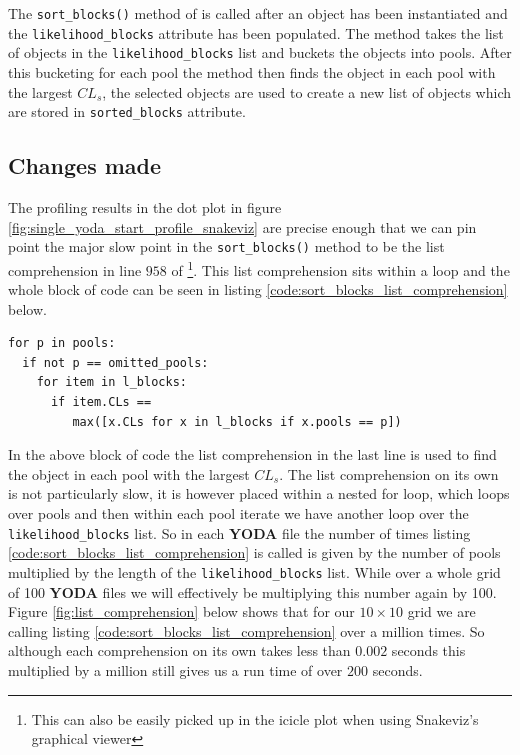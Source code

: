 The \texttt{sort\_blocks()} method of  is called after an object has been instantiated and the \texttt{likelihood\_blocks} attribute has been populated. The method takes the list of  objects in the \texttt{likelihood\_blocks} list and buckets the  objects into pools. After this bucketing for each pool the method then finds the  object in each pool with the largest $CL_{s}$, the selected  objects are used to create a new list of  objects which are stored in  \texttt{sorted\_blocks} attribute.

\subsection{Changes made}
The profiling results in the dot plot in figure  \ref{fig:single_yoda_start_profile_snakeviz} are precise enough that we can pin point the major slow point in the \texttt{sort\_blocks()} method to be the list comprehension in line $958$ of \footnote{This can also be easily picked up in the icicle plot when using Snakeviz's graphical viewer}. This list comprehension sits within a loop and the whole block of code can be seen in listing \ref{code:sort_blocks_list_comprehension} below.

\begin{code}
\label{code:sort_blocks_list_comprehension}
\begin{verbatim}
for p in pools:
  if not p == omitted_pools:
    for item in l_blocks:
      if item.CLs == 
         max([x.CLs for x in l_blocks if x.pools == p]) 
\end{verbatim}
\end{code}

In the above block of code the list comprehension in the last line is used to find the  object in each pool with the largest $CL_s$. The list comprehension on its own is not particularly slow, it is however  placed within a nested for loop, which loops over pools and then within each pool iterate we have another loop over the \texttt{likelihood\_blocks} list. So in each \textbf{YODA} file the number of times listing \ref{code:sort_blocks_list_comprehension} is called is given by the number of pools multiplied by the length of the \texttt{likelihood\_blocks} list. While over a whole grid of 100 \textbf{YODA} files we will effectively be multiplying this number again by 100. Figure \ref{fig:list_comprehension} below shows that for our $10\times 10$ grid we are calling listing \ref{code:sort_blocks_list_comprehension} over a million times. So although each comprehension on its own takes less than $0.002$ seconds this multiplied by a million still gives us a run time of over $200$ seconds.  

